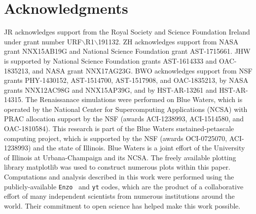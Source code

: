 \documentclass[twocolumn,iop,revtex4]{openjournal}
\newcommand{\enzo}{\texttt{Enzo~}}
\newcommand{\yt}{\texttt{yt}}
\begin{document}
\section*{Acknowledgments}

JR acknowledges support from the Royal Society and Science Foundation Ireland under
grant number URF$\backslash$R1$\backslash$191132.
ZH acknowledges support from NASA grant NNX15AB19G and National Science Foundation grant AST-1715661.
JHW is supported by National Science Foundation grants AST-1614333 and
OAC-1835213, and NASA grant NNX17AG23G.  
BWO acknowledges support from NSF  grants  PHY-1430152,  AST-1514700, AST-1517908, and  OAC-1835213,  by  NASA grants NNX12AC98G and NNX15AP39G, and by HST-AR-13261 and HST-AR-14315.  
The Renaissanace simulations were performed on Blue 
Waters, which is operated by the National Center for Supercomputing Applications (NCSA)
with PRAC allocation support by the NSF (awards ACI-1238993, ACI-1514580, and OAC-1810584).
This research is part of the Blue Waters sustained-petascale computing project, which
is supported by the NSF (awards OCI-0725070, ACI-1238993) and the state of
Illinois. Blue Waters is a joint effort of the University of Illinois at
Urbana-Champaign and its NCSA.  The freely available plotting library {\sc
matplotlib} \citep{matplotlib} was used to construct numerous plots within this
paper. Computations and analysis described in this work were performed using the
publicly-available \enzo \citep{Enzo_2014, Enzo_2019} and \yt{} \citep{YT} codes, which are the product of a
collaborative effort of many independent scientists from numerous institutions
around the world. Their commitment to open science
has helped make this work possible.



\end{document}
